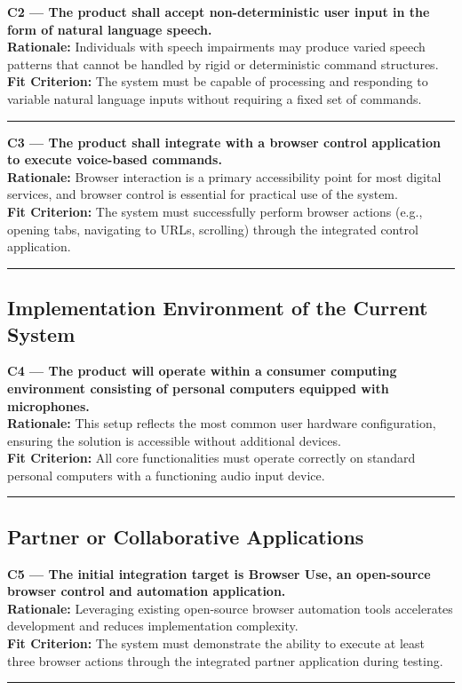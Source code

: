 \documentclass[11pt]{article}
\begin{document}
\noindent\textbf{C2 — The product shall accept non-deterministic user input in the form of natural language speech.}\\
\textbf{Rationale:} Individuals with speech impairments may produce varied speech patterns that cannot be handled by rigid or deterministic command structures.\\
\textbf{Fit Criterion:} The system must be capable of processing and responding to variable natural language inputs without requiring a fixed set of commands.
\par\noindent\rule{\textwidth}{0.4pt}

\noindent\textbf{C3 — The product shall integrate with a browser control application to execute voice-based commands.}\\
\textbf{Rationale:} Browser interaction is a primary accessibility point for most digital services, and browser control is essential for practical use of the system.\\
\textbf{Fit Criterion:} The system must successfully perform browser actions (e.g., opening tabs, navigating to URLs, scrolling) through the integrated control application.
\par\noindent\rule{\textwidth}{0.4pt}


\subsection{Implementation Environment of the Current System}

\noindent\textbf{C4 — The product will operate within a consumer computing environment consisting of personal computers equipped with microphones.}\\
\textbf{Rationale:} This setup reflects the most common user hardware configuration, ensuring the solution is accessible without additional devices.\\
\textbf{Fit Criterion:} All core functionalities must operate correctly on standard personal computers with a functioning audio input device.
\par\noindent\rule{\textwidth}{0.4pt}


\subsection{Partner or Collaborative Applications}

\noindent\textbf{C5 — The initial integration target is Browser Use, an open-source browser control and automation application.}\\
\textbf{Rationale:} Leveraging existing open-source browser automation tools accelerates development and reduces implementation complexity.\\
\textbf{Fit Criterion:} The system must demonstrate the ability to execute at least three browser actions through the integrated partner application during testing.
\par\noindent\rule{\textwidth}{0.4pt}
\end{document}

